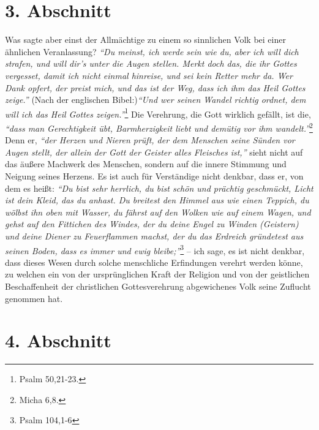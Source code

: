 \section{3. Abschnitt} \label{kap5_ab3}


Was sagte aber einst der Allmächtige  zu einem so
sinnlichen Volk bei einer ähnlichen Veranlassung?
\textit{"`Du meinst, ich werde sein wie du, aber ich will dich
strafen, und will dir’s unter die Augen stellen. Merkt doch das, die ihr Gottes
vergesset, damit ich nicht einmal hinreise, und sei kein Retter mehr da. Wer
Dank opfert, der preist mich, und das ist der Weg, dass ich ihm das Heil
Gottes zeige."'} (Nach der englischen Bibel:)\textit{"`Und wer seinen Wandel
richtig
ordnet, dem will ich das Heil Gottes zeigen."'}\footnote{Psalm 50,21-23.}
Die Verehrung, die Gott wirklich gefällt, ist die, \label{Rechtfertigung}
\textit{"`dass man Gerechtigkeit übt, Barmherzigkeit liebt und demütig vor ihm
wandelt."'}\footnote{Micha 6,8.}
Denn er,
\textit{"`der Herzen und Nieren prüft, der dem Menschen seine Sünden vor Augen
stellt, der allein der Gott der Geister alles Fleisches ist,"'} sieht nicht
auf das äußere Machwerk des Menschen, sondern auf die innere Stimmung und
Neigung seines Herzens. Es ist auch für Verständige nicht denkbar, dass er, von
dem es heißt:
\textit{"`Du bist sehr herrlich, du bist schön und prächtig geschmückt,
Licht ist dein Kleid, das du anhast. Du breitest den Himmel aus wie einen
Teppich, du wölbst ihn oben mit Wasser, du fährst auf den Wolken wie auf
einem Wagen, und gehst auf den Fittichen des Windes, der du deine Engel zu
Winden (Geistern) und deine Diener zu Feuerflammen machst, der du das Erdreich
gründetest aus seinen Boden, dass es immer und ewig bleibe;"'}\footnote{Psalm
104,1-6}
-- ich sage, es ist nicht denkbar, dass dieses Wesen durch solche
menschliche Erfindungen verehrt werden könne, zu welchen ein von der
ursprünglichen Kraft der Religion und von der geistlichen Beschaffenheit der
christlichen Gottesverehrung abgewichenes Volk seine Zuflucht genommen hat.

\section{4. Abschnitt} \label{kap5_ab4}


